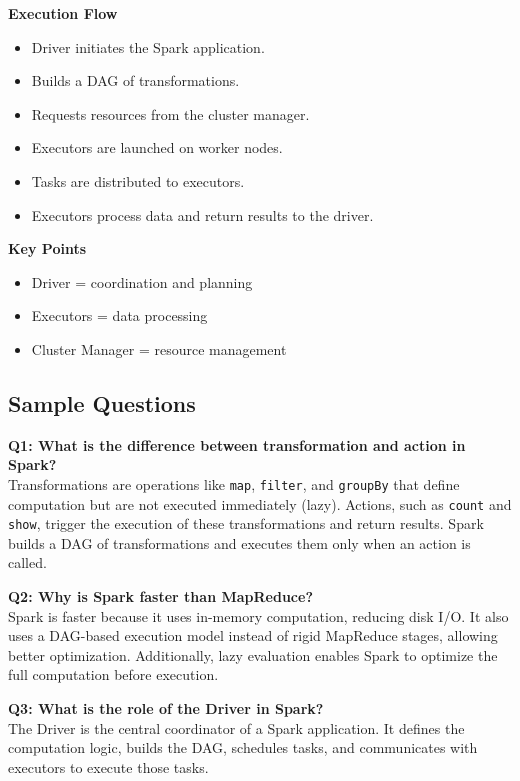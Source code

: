 \documentclass[10pt,a4paper]{article}
\begin{document}
	\textbf{Execution Flow}
	\begin{itemize}
	    \item Driver initiates the Spark application.
	    \item Builds a DAG of transformations.
	    \item Requests resources from the cluster manager.
	    \item Executors are launched on worker nodes.
	    \item Tasks are distributed to executors.
	    \item Executors process data and return results to the driver.
	\end{itemize}
	
	\textbf{Key Points}
	\begin{itemize}
	    \item Driver = coordination and planning
	    \item Executors = data processing
	    \item Cluster Manager = resource management
	\end{itemize}
	
	
	\subsection{Sample Questions}
	
	\textbf{Q1: What is the difference between transformation and action in Spark?} \\
	Transformations are operations like \texttt{map}, \texttt{filter}, and \texttt{groupBy} that define computation but are not executed immediately (lazy). Actions, such as \texttt{count} and \texttt{show}, trigger the execution of these transformations and return results. Spark builds a DAG of transformations and executes them only when an action is called.
	
	\vspace{0.5em}
	
	\textbf{Q2: Why is Spark faster than MapReduce?} \\
	Spark is faster because it uses in-memory computation, reducing disk I/O. It also uses a DAG-based execution model instead of rigid MapReduce stages, allowing better optimization. Additionally, lazy evaluation enables Spark to optimize the full computation before execution.
	
	\vspace{0.5em}
	
	\textbf{Q3: What is the role of the Driver in Spark?} \\
	The Driver is the central coordinator of a Spark application. It defines the computation logic, builds the DAG, schedules tasks, and communicates with executors to execute those tasks.
	
\end{document}
